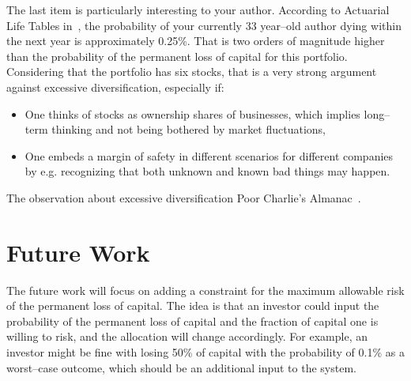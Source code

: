 \documentclass{article}
\begin{document}
\noindent The last item is particularly interesting to your author. According to
Actuarial Life Tables in~\cite{lifeTables}, the probability of your currently 33
year--old author dying within the next year is approximately 0.25\%. That is two
orders of magnitude higher than the probability of the permanent loss of capital
for this portfolio. Considering that the portfolio has six stocks, that is a
very strong argument against excessive diversification, especially if:
\begin{itemize}
    \item One thinks of stocks as ownership shares of businesses, which implies
    long--term thinking and not being bothered by market fluctuations, 
    \item One embeds a margin of safety in different scenarios for different
    companies by e.g. recognizing that both unknown and known bad things may
    happen.
\end{itemize}

\noindent The observation about excessive diversification Poor Charlie's
Almanac~\cite{almanack}.

\section{Future Work}
\label{sec:futureWork}

\noindent The future work will focus on adding a constraint for the maximum
allowable risk of the permanent loss of capital. The idea is that an investor
could input the probability of the permanent loss of capital and the fraction of
capital one is willing to risk, and the allocation will change accordingly. For
example, an investor might be fine with losing 50\% of capital with the
probability of 0.1\% as a worst--case outcome, which should be an additional
input to the system.

\clearpage



\end{document}
